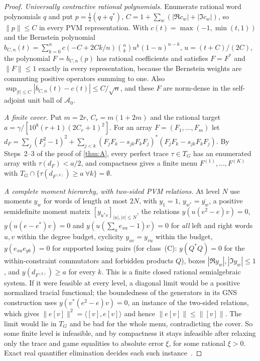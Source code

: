 \begin{proof}
\emph{Universally contractive rational polynomials.} Enumerate rational word polynomials $q$ and put $p=\frac12(q+q^*)$,
$C=1+\sum_w(|\Re c_w|+|\Im c_w|)$, so $\|p\|\le C$ in every PVM representation. With $c(t)=\max(-1,\min(t,1))$ and the
Bernstein polynomial $b_{C,n}(t)=\sum_{k=0}^nc(-C+2Ck/n)\binom nku^k(1-u)^{n-k}$, $u=(t+C)/(2C)$, the polynomial
$F=b_{C,n}(p)$ has rational coefficients and satisfies $F=F^*$ and $\|F\|\le1$ exactly in every representation, because the
Bernstein weights are commuting positive operators summing to one. Also $\sup_{|t|\le C}|b_{C,n}(t)-c(t)|\le C/\sqrt n$, and
these $F$ are norm-dense in the self-adjoint unit ball of $\mathcal A_0$.

\emph{A finite cover.} Put $m=2r$, $C_r=m(1+2m)$ and the rational target $a=\gamma/[10^8(r+1)(2C_r+1)^2]$. For an array
$F=(F_1,\dots,F_m)$ let $d_F=\sum_j(F_j^2-1)^2+\sum_{j<k}(F_jF_k-s_{jk}F_kF_j)^*(F_jF_k-s_{jk}F_kF_j)$. By Steps~2--3 of the
proof of \cref{thm:A}, every perfect trace $\tau\in T_G$ has an enumerated array with $\tau(d_F)<a/2$, and compactness gives
a finite menu $F^{(1)},\dots,F^{(K)}$ with $T_G\cap\{\tau(d_{F^{(k)}})\ge a\ \forall k\}=\emptyset$.

\emph{A complete moment hierarchy, with two-sided PVM relations.} At level $N$ use moments $y_w$ for words of length at most
$2N$, with $y_1=1$, $y_{w^*}=\overline{y_w}$, a positive semidefinite moment matrix $[y_{u^*v}]_{|u|,|v|\le N}$, the relations
$y(u(e^2-e)v)=0$, $y(u(e-e^*)v)=0$ and $y(u(\sum_ae_{xa}-1)v)=0$ for \emph{all} left and right words $u,v$ within the degree
budget, cyclicity $y_{uv}=y_{vu}$ within the budget, $y(e_{xa}e_{yb})=0$ for supported losing pairs (for class~(C):
$y(Q^*Q)=0$ for the within-constraint commutators and forbidden products $Q$), boxes $|\Re y_w|,|\Im y_w|\le1$, and
$y(d_{F^{(k)}})\ge a$ for every $k$. This is a finite closed rational semialgebraic system. If it were feasible at every
level, a diagonal limit would be a positive normalized tracial functional; the boundedness of the generators in its GNS
construction uses $y(v^*(e^2-e)v)=0$, an instance of the two-sided relations, which gives $\|e[v]\|^2=\langle[v],e[v]\rangle$
and hence $\|e[v]\|\le\|[v]\|$. The limit would lie in $T_G$ and be bad for the whole menu, contradicting the cover. So some
finite level is infeasible, and by compactness it stays infeasible after relaxing only the trace and game equalities to
absolute error $\xi$, for some rational $\xi>0$. Exact real quantifier elimination decides each such instance~\cite{CM12}.


\end{proof}
